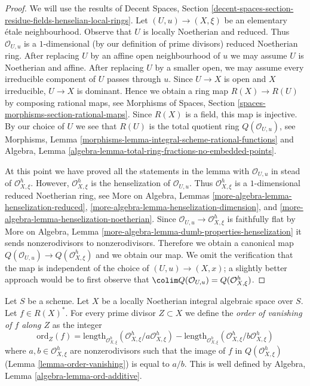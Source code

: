 \begin{proof}
We will use the results of Decent Spaces, Section
\ref{decent-spaces-section-residue-fields-henselian-local-rings}.
Let $(U, u) \to (X, \xi)$ be an elementary \'etale neighbourhood.
Observe that $U$ is locally Noetherian and reduced.
Thus $\mathcal{O}_{U, u}$ is a $1$-dimensional
(by our definition of prime divisors)
reduced Noetherian ring.
After replacing $U$ by an affine open neighbourhood of $u$
we may assume $U$ is Noetherian and affine.
After replacing $U$ by a smaller open, we may assume every irreducible
component of $U$ passes through $u$.
Since $U \to X$ is open and $X$ irreducible, $U \to X$ is dominant.
Hence we obtain a ring map $R(X) \to R(U)$ by composing rational maps, see
Morphisms of Spaces, Section \ref{spaces-morphisms-section-rational-maps}.
Since $R(X)$ is a field, this map is injective.
By our choice of $U$ we see that $R(U)$ is the total quotient
ring $Q(\mathcal{O}_{U, u})$, see
Morphisms, Lemma \ref{morphisms-lemma-integral-scheme-rational-functions}
and
Algebra, Lemma \ref{algebra-lemma-total-ring-fractions-no-embedded-points}.

\medskip\noindent
At this point we have proved all the statements in the lemma with
$\mathcal{O}_{U, u}$ in stead of $\mathcal{O}_{X, \xi}^h$.
However, $\mathcal{O}_{X, \xi}^h$ is the henselization of
$\mathcal{O}_{U, u}$. Thus $\mathcal{O}_{X, \xi}^h$ is a $1$-dimensional
reduced Noetherian ring, see
More on Algebra, Lemmas
\ref{more-algebra-lemma-henselization-reduced},
\ref{more-algebra-lemma-henselization-dimension}, and
\ref{more-algebra-lemma-henselization-noetherian}.
Since $\mathcal{O}_{U, u} \to \mathcal{O}_{X, \xi}^h$ is
faithfully flat by More on Algebra, Lemma
\ref{more-algebra-lemma-dumb-properties-henselization}
it sends nonzerodivisors to nonzerodivisors.
Therefore we obtain a canonical map
$Q(\mathcal{O}_{U, u}) \to Q(\mathcal{O}_{X, \xi}^h)$
and we obtain our map.
We omit the verification that the map is independent of
the choice of $(U, u) \to (X, x)$; a slightly better
approach would be to first observe that
$\colim Q(\mathcal{O}_{U, u}) = Q(\mathcal{O}_{X, \xi}^h)$.
\end{proof}

\begin{definition}
\label{definition-order-vanishing}
Let $S$ be a scheme. Let $X$ be a locally Noetherian integral algebraic
space over $S$. Let $f \in R(X)^*$. For every prime divisor
$Z \subset X$ we define the {\it order of vanishing of $f$ along $Z$}
as the integer
$$
\text{ord}_Z(f) =
\text{length}_{\mathcal{O}_{X, \xi}^h}
(\mathcal{O}_{X, \xi}^h/a \mathcal{O}_{X, \xi}^h) -
\text{length}_{\mathcal{O}_{X, \xi}^h}
(\mathcal{O}_{X, \xi}^h/b \mathcal{O}_{X, \xi}^h)
$$
where $a, b \in \mathcal{O}_{X, \xi}^h$ are nonzerodivisors
such that the image of $f$ in $Q(\mathcal{O}_{X, \xi}^h)$
(Lemma \ref{lemma-order-vanishing}) is equal to $a/b$.
This is well defined by
Algebra, Lemma \ref{algebra-lemma-ord-additive}.
\end{definition}

